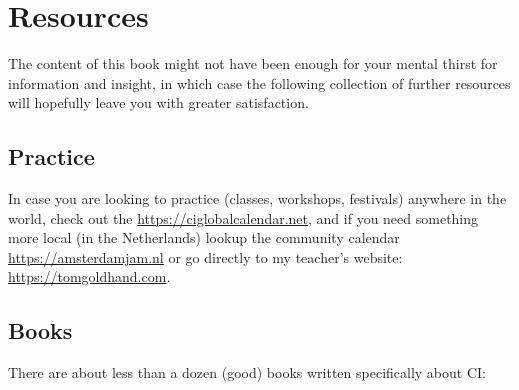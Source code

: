 \newcommand{\res}[2]{``\href{#1}{\textit{#2}}''}

\chapter{Resources}\label{ch:resources}

The content of this book might not have been enough for your mental thirst for information and insight, in which case the following collection of further resources will hopefully leave you with greater satisfaction.

\section{Practice}\label{sec:practice}

In case you are looking to practice (classes, workshops, festivals) anywhere in the world, check out the \url{https://ciglobalcalendar.net}, and if you need something more local (in the Netherlands) lookup the community calendar \url{https://amsterdamjam.nl} or go directly to my teacher's website: \url{https://tomgoldhand.com}.

\section{Books}\label{sec:books}

There are about less than a dozen (good) books written specifically about CI\@:

